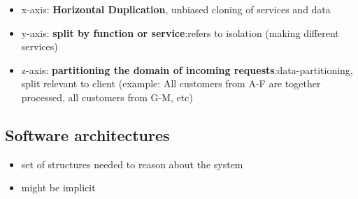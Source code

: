 \documentclass[a4paper]{article}
\begin{document}
\begin{multicols}{3}
\begin{itemize}
    \item x-axis: \textbf{Horizontal Duplication}, unbiased cloning of services and data
    \item y-axis: \textbf{split by function or service}:refers to isolation (making different services)
    \item z-axis: \textbf{partitioning the domain of incoming requests}:data-partitioning, split relevant to 
    client (example: All customers from A-F are together processed, all customers from G-M, etc)
\end{itemize}

\subsection*{Software architectures}
\begin{itemize}
    \item set of structures needed to reason about the system
    \item might be implicit
\end{itemize}


\end{multicols}
\end{document}

